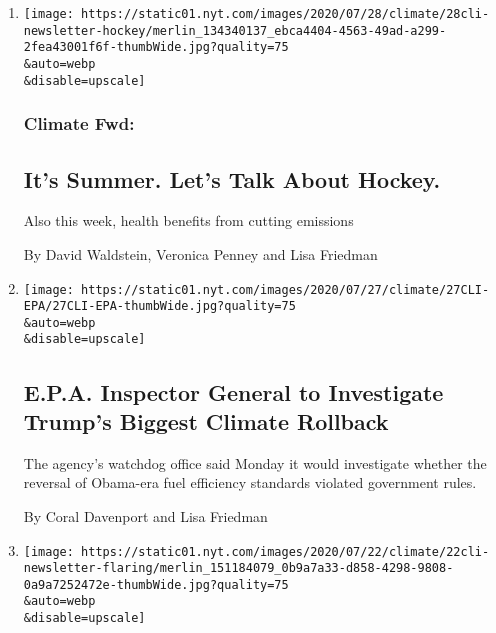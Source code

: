 \begin{enumerate}
\def\labelenumi{\arabic{enumi}.}
\item
  \href{/2020/07/29/climate/skating-hockey-climate-change.html}{}

  \texttt{[image: https://static01.nyt.com/images/2020/07/28/climate/28cli-newsletter-hockey/merlin\_134340137\_ebca4404-4563-49ad-a299-2fea43001f6f-thumbWide.jpg?quality=75\\\&auto=webp\\\&disable=upscale]}

  \hypertarget{climate-fwd}{%
  \subsubsection{Climate Fwd:}\label{climate-fwd}}

  \hypertarget{its-summer-lets-talk-about-hockey}{%
  \subsection{It's Summer. Let's Talk About
  Hockey.}\label{its-summer-lets-talk-about-hockey}}

  Also this week, health benefits from cutting emissions

  By David Waldstein, Veronica Penney and Lisa Friedman
\item
  \href{/2020/07/27/climate/trump-fuel-efficiency-rule.html}{}

  \texttt{[image: https://static01.nyt.com/images/2020/07/27/climate/27CLI-EPA/27CLI-EPA-thumbWide.jpg?quality=75\\\&auto=webp\\\&disable=upscale]}

  \hypertarget{epa-inspector-general-to-investigate-trumps-biggest-climate-rollback}{%
  \subsection{E.P.A. Inspector General to Investigate Trump's Biggest
  Climate
  Rollback}\label{epa-inspector-general-to-investigate-trumps-biggest-climate-rollback}}

  The agency's watchdog office said Monday it would investigate whether
  the reversal of Obama-era fuel efficiency standards violated
  government rules.

  By Coral Davenport and Lisa Friedman
\item
  \href{/2020/07/22/climate/nyt-climate-newsletter-premature-babies.html}{}

  \texttt{[image: https://static01.nyt.com/images/2020/07/22/climate/22cli-newsletter-flaring/merlin\_151184079\_0b9a7a33-d858-4298-9808-0a9a7252472e-thumbWide.jpg?quality=75\\\&auto=webp\\\&disable=upscale]}


\end{enumerate}
